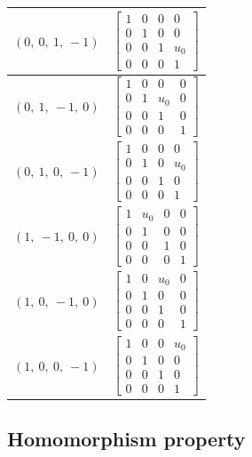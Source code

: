 \documentclass[11pt]{article}
\theoremstyle{definition}
\begin{document}
\begin{longtable}{|l|c|}
    \hline
    $\left( 0, \  0, \  1, \  -1\right)$ & ${\left[\begin{matrix}1 & 0 & 0 & 0\\0 & 1 & 0 & 0\\0 & 0 & 1 & u_{0}\\0 & 0 & 0 & 1\end{matrix}\right]}$ \\
    \hline
    $\left( 0, \  1, \  -1, \  0\right)$ & ${\left[\begin{matrix}1 & 0 & 0 & 0\\0 & 1 & u_{0} & 0\\0 & 0 & 1 & 0\\0 & 0 & 0 & 1\end{matrix}\right]}$ \\
    \hline
    $\left( 0, \  1, \  0, \  -1\right)$ & ${\left[\begin{matrix}1 & 0 & 0 & 0\\0 & 1 & 0 & u_{0}\\0 & 0 & 1 & 0\\0 & 0 & 0 & 1\end{matrix}\right]}$ \\
    \hline
    $\left( 1, \  -1, \  0, \  0\right)$ & ${\left[\begin{matrix}1 & u_{0} & 0 & 0\\0 & 1 & 0 & 0\\0 & 0 & 1 & 0\\0 & 0 & 0 & 1\end{matrix}\right]}$ \\
    \hline
    $\left( 1, \  0, \  -1, \  0\right)$ & ${\left[\begin{matrix}1 & 0 & u_{0} & 0\\0 & 1 & 0 & 0\\0 & 0 & 1 & 0\\0 & 0 & 0 & 1\end{matrix}\right]}$ \\
    \hline
    $\left( 1, \  0, \  0, \  -1\right)$ & ${\left[\begin{matrix}1 & 0 & 0 & u_{0}\\0 & 1 & 0 & 0\\0 & 0 & 1 & 0\\0 & 0 & 0 & 1\end{matrix}\right]}$ \\
    \hline
\end{longtable}


\subsection{Homomorphism property}
\end{document}
